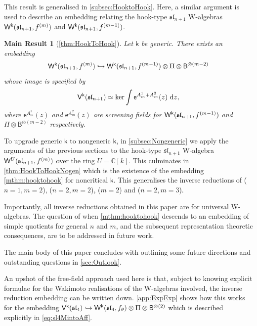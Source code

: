 \documentclass[10pt,a4paper]{amsart}
\numberwithin{equation}{section}
\renewcommand{\cong}{\simeq} %
\newcommand{\dd}{\mathrm{d}}   %
\newcommand{\ee}{\mathsf{e}}   %
\newcommand{\kk}{\mathsf{k}}   %
\DeclarePairedDelimiter{\brac}{\lparen}{\rparen}   %
\newcommand{\fld}[1]{\mathbb{#1}}    %
\newcommand{\alg}[1]{\mathfrak{#1}}  %
\newcommand{\VOA}[1]{\mathsf{#1}}    %
\newcommand{\CC}{\fld{C}}
\newcommand{\SLA}[2]{\alg{#1}_{#2}}                      %
\newcommand{\slfour}{\SLA{sl}{4}}
\newcommand{\slnpone}{\SLA{sl}{n+1}}
\newcommand{\fmin}{f_\theta}                                        %
\newcommand{\fhook}[1]{f^{(#1)}}                                  %
\newcommand{\Wsymb}{\VOA{W}}
\newcommand{\uaffvoa}[2]{\VOA{V}^{#1}\brac{#2}}                   %
\newcommand{\bgvoa}{\VOA{B}}                                      %
\newcommand{\uQHR}[3]{\Wsymb^{#1}\brac{#2,#3}}                    %
\theoremstyle{plain}
\newtheorem{mthm}{Main Result}
\begin{document}
This result is generalised in \cref{subsec:HooktoHook}. Here, a similar argument is used to describe an embedding relating the hook-type $\slnpone$ W-algebras $\uQHR{\kk}{\slnpone}{\fhook{m}}$ and $\uQHR{\kk}{\slnpone}{\fhook{m-1}}$.

\begin{mthm}[\cref{thm:HookToHook}]
Let $\kk$ be generic. There exists an embedding 
%
\begin{equation} \label{mthm:hooktohook}
    \uQHR{\kk}{\slnpone}{\fhook{m}} \hookrightarrow \uQHR{\kk}{\slnpone}{\fhook{m-1}} \otimes \Pi \otimes \bgvoa^{\otimes(m-2)}
\end{equation}
%
whose image is specified by
%
\begin{equation}
    \uaffvoa{\kk}{\slnpone} \cong \textup{\normalfont ker} \int  \ee^{A^1_m+A^2_m}(z) \ \dd z,
\end{equation}
%
where $\ee^{A^1_m}(z)$ and $\ee^{A^2_m}(z)$ are screening fields for $\uQHR{\kk}{\slnpone}{\fhook{m-1}}$ and $\Pi \otimes \bgvoa^{\otimes(m-2)}$ respectively.
\end{mthm}

To upgrade generic $\kk$ to nongeneric $\kk$, in \cref{subsec:Nongeneric} we apply the arguments of the previous sections to the hook-type $\slnpone$ W-algebra $\uQHR{U}{\slnpone}{\fhook{m}}$ over the ring $U=\CC[k]$. This culminates in \cref{thm:HookToHookNogen} which is the existence of the embedding \eqref{mthm:hooktohook} for noncritical $\kk$. This generalises the inverse reductions of \cite{AdaRea17} ($n=1,m=2$), \cite{AdaRea20} ($n=2, m=2$), \cite{Feh21c} ($m=2$) and \cite{ACG21} ($n=2, m=3$). 

Importantly, all inverse reductions obtained in this paper are for universal W-algebras. The question of when \eqref{mthm:hooktohook} descends to an embedding of simple quotients for general $n$ and $m$, and the subsequent representation theoretic consequences, are to be addressed in future work.

The main body of this paper concludes with outlining some future directions and outstanding questions in \cref{sec:Outlook}.

An upshot of the free-field approach used here is that, subject to knowing explicit formulae for the Wakimoto realisations of the W-algebras involved, the inverse reduction embedding can be written down. \cref{app:ExpExp} shows how this works for the embedding $\uaffvoa{\kk}{\slfour} \hookrightarrow \uQHR{\kk}{\slfour}{\fmin} \otimes \Pi \otimes \bgvoa^{\otimes(2)}$ which is described explicitly in \eqref{eq:sl4MintoAff}. 
\end{document}
